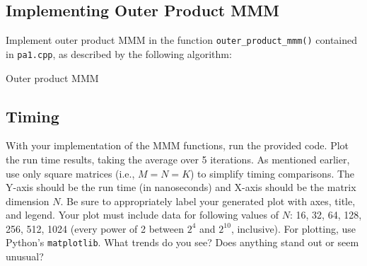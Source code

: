 \documentclass[a4 paper]{article}
\begin{document}
\subsection*{Implementing Outer Product MMM}
Implement outer product MMM in the function \texttt{outer\_product\_mmm()} contained in \texttt{pa1.cpp}, as described by the following algorithm:

\begin{algorithm}[H]
\SetAlgoLined
\SetInd{0.25em}{0.5em}
\caption{Outer product MMM}
\label{algo:naivemm-kmn}
\end{algorithm}

\subsection*{Timing}
With your implementation of the MMM functions, run the provided code.
Plot the run time results, taking the average over 5 iterations.
As mentioned earlier, use only square matrices (i.e., $M = N = K$) to simplify timing comparisons.
The Y-axis should be the run time (in nanoseconds) and X-axis should be the matrix dimension $N$.
Be sure to appropriately label your generated plot with axes, title, and legend.
Your plot must include data for following values of $N$: 16, 32, 64, 128, 256, 512, 1024 (every power of 2 between $2^4$ and $2^{10}$, inclusive).
For plotting, use Python’s \texttt{matplotlib}.
What trends do you see?
Does anything stand out or seem unusual?

\end{document}
